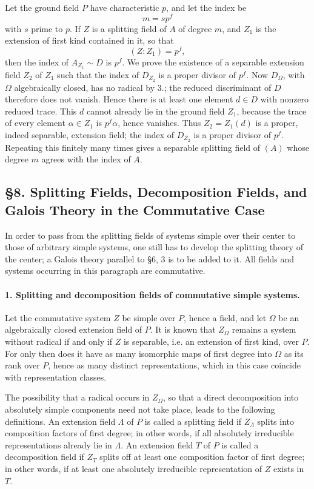 \documentclass[11pt]{article}
\begin{document}
Let the ground field \(P\) have characteristic \(p\), and let the index be
\[
        m=s p^f
\]
with \(s\) prime to \(p\). If \(Z\) is a splitting field of \(A\) of degree \(m\), and \(Z_1\) is the extension of first kind contained in it, so that
\[
        (Z:Z_1)=p^f,
\]
then the index of \(A_{Z_1}\sim D\) is \(p^f\). We prove the existence of a separable extension field \(Z_2\) of \(Z_1\) such that the index of \(D_{Z_2}\) is a proper divisor of \(p^f\). Now \(D_\Omega\), with \(\Omega\) algebraically closed, has no radical by 3.; the reduced discriminant of \(D\) therefore does not vanish. Hence there is at least one element \(d\in D\) with nonzero reduced trace. This \(d\) cannot already lie in the ground field \(Z_1\), because the trace of every element \(\alpha\in Z_1\) is \(p^f\alpha\), hence vanishes. Thus \(Z_2=Z_1(d)\) is a proper, indeed separable, extension field; the index of \(D_{Z_2}\) is a proper divisor of \(p^f\). Repeating this finitely many times gives a separable splitting field of \((A)\) whose degree \(m\) agrees with the index of \(A\).

\subsection*{§8. Splitting Fields, Decomposition Fields, and Galois Theory in the Commutative Case}

In order to pass from the splitting fields of systems simple over their center to those of arbitrary simple systems, one still has to develop the splitting theory of the center; a Galois theory parallel to §6, 3 is to be added to it. All fields and systems occurring in this paragraph are commutative.

\paragraph{1. Splitting and decomposition fields of commutative simple systems.}
Let the commutative system \(Z\) be simple over \(P\), hence a field, and let \(\Omega\) be an algebraically closed extension field of \(P\). It is known that \(Z_\Omega\) remains a system without radical if and only if \(Z\) is separable, i.e. an extension of first kind, over \(P\). For only then does it have as many isomorphic maps of first degree into \(\Omega\) as its rank over \(P\), hence as many distinct representations, which in this case coincide with representation classes.

The possibility that a radical occurs in \(Z_\Omega\), so that a direct decomposition into absolutely simple components need not take place, leads to the following definitions. An extension field \(\Lambda\) of \(P\) is called a splitting field if \(Z_\Lambda\) splits into composition factors of first degree; in other words, if all absolutely irreducible representations already lie in \(\Lambda\). An extension field \(T\) of \(P\) is called a decomposition field if \(Z_T\) splits off at least one composition factor of first degree; in other words, if at least one absolutely irreducible representation of \(Z\) exists in \(T\).
\end{document}
